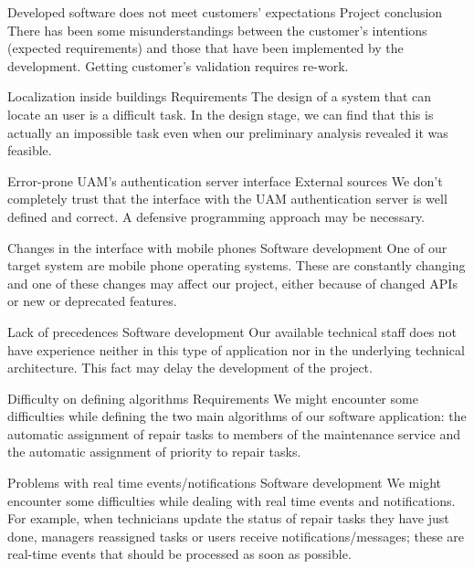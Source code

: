 \begin{risk}{Developed software does not meet customers' expectations}
\riskcat Project conclusion
\riskdesc There has been some misunderstandings between the customer's intentions (expected requirements) and those that have been implemented by the development. Getting customer's validation requires re-work.
\end{risk}

\begin{risk}{Localization inside buildings}
\riskcat Requirements
\riskdesc The design of a system that can locate an user is a difficult task. In the design stage, we can find that this is actually an impossible task even when our preliminary analysis revealed it was feasible.
\end{risk}

\begin{risk}{Error-prone UAM's authentication server interface}
\riskcat External sources
\riskdesc We don't completely trust that the interface with the UAM authentication server is well defined and correct. A defensive programming approach may be necessary.
\end{risk}

\begin{risk}{Changes in the interface with mobile phones}
\riskcat Software development
\riskdesc One of our target system are mobile phone operating systems. These are constantly changing and one of these changes may affect our project, either because of changed APIs or new or deprecated features.
\end{risk}

\begin{risk}{Lack of precedences}
\riskcat Software development
\riskdesc Our available technical staff does not have experience neither in this type of application nor in the underlying technical architecture. This fact may delay the development of the project.
\end{risk}

\begin{risk}{Difficulty on defining algorithms}
\riskcat Requirements
\riskdesc We might encounter some difficulties while defining the two main algorithms of our software application: the automatic assignment of repair tasks to members of the maintenance service and the automatic assignment of priority to repair tasks.
\end{risk}

\begin{risk}{Problems with real time events/notifications}
\riskcat Software development
\riskdesc We might encounter some difficulties while dealing with real time events and notifications. For example, when technicians update the status of repair tasks they have just done, managers reassigned tasks or users receive notifications/messages; these are real-time events that should be processed as soon as possible.
\end{risk}

